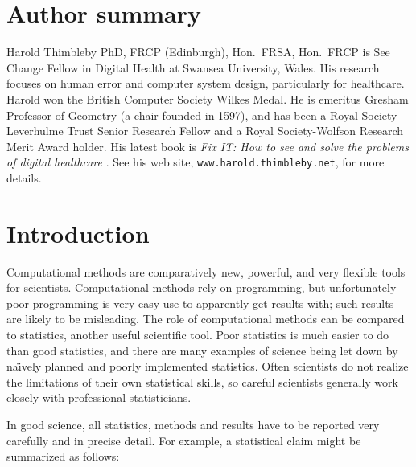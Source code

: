 \newpage\section*{Author summary}

Harold Thimbleby PhD, FRCP (Edinburgh), Hon.\ FRSA, Hon.\ FRCP is See Change Fellow in Digital Health at Swansea University, Wales. His research focuses on human error and computer system design, particularly for healthcare. 
Harold won the British Computer Society Wilkes Medal. He is emeritus Gresham Professor of Geometry (a chair founded in 1597), and has been a Royal Society-Leverhulme Trust Senior Research Fellow and a Royal Society-Wolfson Research Merit Award holder. His latest book is  \emph{Fix IT: How to see and solve the problems of digital healthcare\/} \cite{fixit}.  See his web site, \texttt{www.harold.thimbleby.net}, for more details.
\linenumbers


\section{Introduction}\label{problems}
Computational methods are comparatively new, powerful, and very flexible tools for scientists. Computational methods rely on programming, but unfortunately poor programming is very easy use to apparently get results with; such results are likely to be misleading. The role of computational methods can be compared to statistics, another useful scientific tool. Poor statistics is much easier to do than good statistics, and there are many examples of science being let down by na\"\i vely planned and poorly implemented statistics. Often scientists do not realize the limitations of their own statistical skills, so careful scientists generally work closely with professional statisticians.

{I}{n good science}, all statistics, methods and results have to be reported very carefully and in precise detail. For example, a statistical claim might be summarized as follows:

